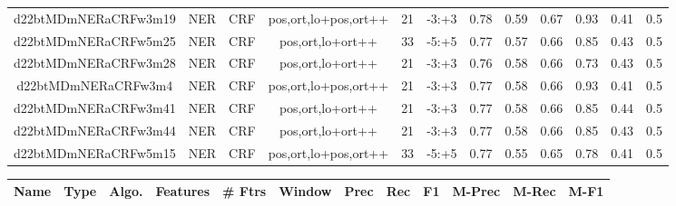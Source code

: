 \documentclass[a4paper]{article}
\begin{document}
\begin{landscape}
\begin{center}
\begin{tabular}{ |c|c|c|c|c|c|c|c|c|c|c|c|}
 
 	
 	\small{ d22btMDmNERaCRFw3m19 } & \small{ NER} & \small{  CRF }  & pos,ort,lo+pos,ort++  &  21 &  \small{  -3:+3 }  &  0.78 & 0.59 & 0.67  &  0.93 & 0.41 & 0.5 \\
 	

 
 	
 	\small{ d22btMDmNERaCRFw5m25 } & \small{ NER} & \small{  CRF }  & pos,ort,lo+ort++  &  33 &  \small{  -5:+5 }  &  0.77 & 0.57 & 0.66  &  0.85 & 0.43 & 0.5 \\
 	

 
 	
 	\small{ d22btMDmNERaCRFw3m28 } & \small{ NER} & \small{  CRF }  & pos,ort,lo+ort++  &  21 &  \small{  -3:+3 }  &  0.76 & 0.58 & 0.66  &  0.73 & 0.43 & 0.5 \\
 	

 
 	
 	\small{ d22btMDmNERaCRFw3m4 } & \small{ NER} & \small{  CRF }  & pos,ort,lo+pos,ort++  &  21 &  \small{  -3:+3 }  &  0.77 & 0.58 & 0.66  &  0.93 & 0.41 & 0.5 \\
 	

 
 	
 	\small{ d22btMDmNERaCRFw3m41 } & \small{ NER} & \small{  CRF }  & pos,ort,lo+ort++  &  21 &  \small{  -3:+3 }  &  0.77 & 0.58 & 0.66  &  0.85 & 0.44 & 0.5 \\
 	

 
 	
 	\small{ d22btMDmNERaCRFw3m44 } & \small{ NER} & \small{  CRF }  & pos,ort,lo+ort++  &  21 &  \small{  -3:+3 }  &  0.77 & 0.58 & 0.66  &  0.85 & 0.43 & 0.5 \\
 	

 
 	
 	\small{ d22btMDmNERaCRFw5m15 } & \small{ NER} & \small{  CRF }  & pos,ort,lo+pos,ort++  &  33 &  \small{  -5:+5 }  &  0.77 & 0.55 & 0.65  &  0.78 & 0.41 & 0.5 \\
 	
 \hline
\end{tabular}
\end{center}




\begin{center}
\begin{tabular}{ |c|c|c|c|c|c|c|c|c|c|c|c|} 
 \hline
 	Name & Type & Algo. & Features & \# Ftrs & Window & Prec & Rec & F1 & M-Prec & M-Rec & M-F1\\
 \hline

 	

 
 	

\end{tabular}
\end{center}
\end{landscape}
\end{document}
